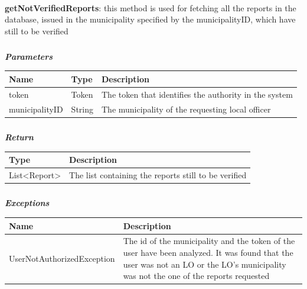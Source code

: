 					\paragraph{}
							\textbf{getNotVerifiedReports}: this method is used for fetching all the reports in the
database, issued in the municipality specified by the municipalityID, which have still to be verified
							\clearpage
							\subparagraph{}
							\textit{\textbf{Parameters}}
							\vspace{-2mm}
								\begin{table}[!h]
									\begin{tabular}{L{0.2\textwidth}L{0.15\textwidth}L{0.45\textwidth}}
										\toprule
										\textbf{Name} & \textbf{Type} & \textbf{Description} \\
										\midrule
								  		token & Token & The token that identifies the authority in the system \\
								  		municipalityID & String & The municipality of the requesting local officer \\
								 		\bottomrule
									\end{tabular}
								\end{table}
							\subparagraph{}
							\vspace{-6mm}
								\textit{\textbf{Return}}
								\vspace{-2mm}
									\begin{table}[!h]
									\begin{tabular}{L{0.2\textwidth}L{0.6\textwidth}}
										\toprule
										\textbf{Type} & \textbf{Description} \\
										\midrule
								  		List<Report> & The list containing the reports still to be verified \\
								 		\bottomrule
									\end{tabular}
								\end{table}
							\subparagraph{}
							\vspace{-6mm}
								\textit{\textbf{Exceptions}}
								\vspace{-2mm}
									\begin{table}[!h]
									\begin{tabular}{L{0.4\textwidth}L{0.4\textwidth}}
										\toprule
										\textbf{Name} & \textbf{Description} \\
										\midrule
										UserNotAuthorizedException & The id of the municipality and the token of the user have been analyzed. It was found that the user was not an LO or the LO's municipality was not the one of the reports requested \\
								 		\bottomrule
									\end{tabular}
								\end{table}
								
